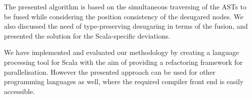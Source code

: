 \documentclass[11pt]{amsart}
\begin{document}
The presented algorithm is based on the simultaneous traversing of the
ASTs to be fused while considering the position consistency of the
desugared nodes. We also discussed the need of type-preserving
desugaring in terms of the fusion, and presented the solution for the
Scala-specific deviations.


We have implemented and evaluated our methodology by creating a
language processing tool for Scala with the aim of providing a
refactoring framework for parallelisation. However the presented
approach can be used for other programming languages as well, where
the required compiler front end is easily accessible.


\newpage

%
%
\end{document}
